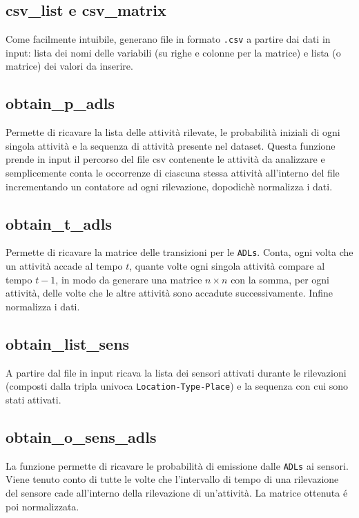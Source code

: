 \documentclass[12pt, a4paper]{scrartcl}
\begin{document}
\subsection*{csv\_list e csv\_matrix}
Come facilmente intuibile, generano file in formato \texttt{.csv} a partire dai dati in input: lista dei nomi delle variabili (su righe e colonne per la matrice) e lista (o matrice) dei valori da inserire.

\subsection*{obtain\_p\_adls}
Permette di ricavare la lista delle attività rilevate, le probabilità iniziali di ogni singola attività e la sequenza di attività presente nel dataset. Questa funzione prende in input il percorso del file csv contenente le attività da analizzare e semplicemente conta le occorrenze di ciascuna stessa attività all'interno del file incrementando un contatore ad ogni rilevazione, dopodichè normalizza i dati.

\subsection*{obtain\_t\_adls}
Permette di ricavare la matrice delle transizioni per le \texttt{ADLs}. Conta, ogni volta che un attività accade al tempo $t$, quante volte ogni singola attività compare al tempo $t-1$, in modo da generare una matrice $n\times n$ con la somma, per ogni attività, delle volte che le altre attività sono accadute successivamente. Infine normalizza i dati.

\subsection*{obtain\_list\_sens}
A partire dal file in input ricava la lista dei sensori attivati durante le rilevazioni (composti dalla tripla univoca \texttt{Location-Type-Place}) e la sequenza con cui sono stati attivati.

\subsection*{obtain\_o\_sens\_adls}
La funzione permette di ricavare le probabilità di emissione dalle \texttt{ADLs} ai sensori. Viene tenuto conto di tutte le volte che l'intervallo di tempo di una rilevazione del sensore cade all'interno della rilevazione di un'attività. La matrice ottenuta é poi normalizzata.
\end{document}
